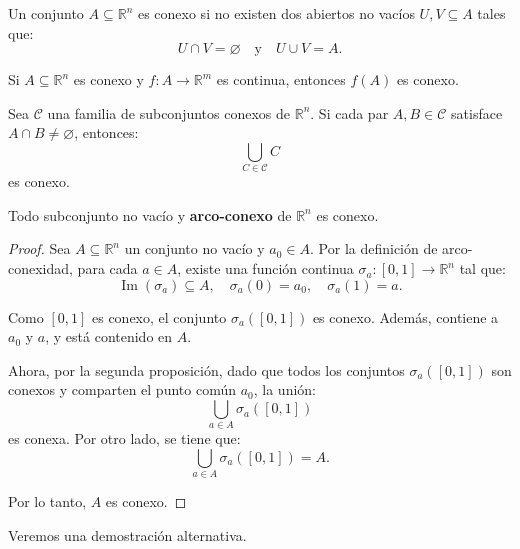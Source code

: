 \begin{definition}[Conexo]
    Un conjunto \(A \subseteq \mathbb{R}^n\) es conexo si no existen dos abiertos no vacíos \(U, V \subseteq A\) tales que:
    \[
        U \cap V = \varnothing \quad \text{y} \quad U \cup V = A.
    \]
\end{definition}

\begin{prop}
    Si \(A \subseteq \mathbb{R}^n\) es conexo y \(f: A \to \mathbb{R}^m\) es continua, entonces \(f(A)\) es conexo.
\end{prop}

\begin{prop}
    Sea \(\mathcal{C}\) una familia de subconjuntos conexos de \(\mathbb{R}^n\). Si cada par \(A, B \in \mathcal{C}\) satisface \(A \cap B \neq \varnothing\), entonces:
    \[
        \bigcup_{C \in \mathcal{C}} C
    \]
    es conexo.
\end{prop}

\begin{theorem}
    Todo subconjunto no vacío y \textbf{arco-conexo} de \(\mathbb{R}^n\) es conexo.
    \begin{proof}
        Sea \(A \subseteq \mathbb{R}^n\) un conjunto no vacío y \(a_0 \in A\). Por la definición de arco-conexidad, para cada \(a \in A\), existe una función continua \(\sigma_a : [0, 1] \to \mathbb{R}^n\) tal que:
        \[
            \operatorname{Im}(\sigma_a) \subseteq A, \quad \sigma_a(0) = a_0, \quad \sigma_a(1) = a.
        \]

        Como \([0, 1]\) es conexo, el conjunto \(\sigma_a([0, 1])\) es conexo. Además, contiene a \(a_0\) y \(a\), y está contenido en \(A\).

        Ahora, por la segunda proposición, dado que todos los conjuntos \(\sigma_a([0, 1])\) son conexos y comparten el punto común \(a_0\), la unión:
        \[
            \bigcup_{a \in A} \sigma_a([0, 1])
        \]
        es conexa. Por otro lado, se tiene que:
        \[
            \bigcup_{a \in A} \sigma_a([0, 1]) = A.
        \]

        Por lo tanto, \(A\) es conexo.
    \end{proof}
\end{theorem}

Veremos una demostración alternativa.

